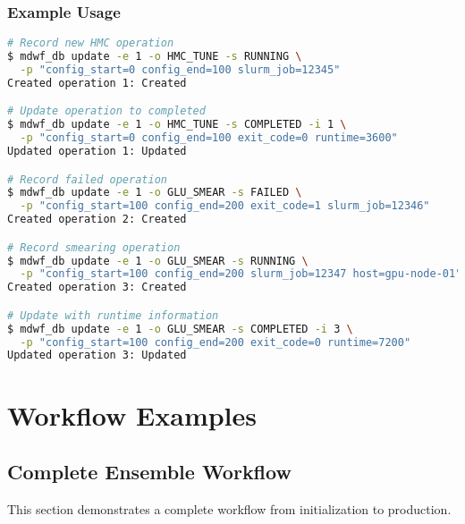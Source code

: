\documentclass{article}
\begin{document}
\subsubsection{Example Usage}

\begin{lstlisting}[language=bash, caption=Update Operation Examples]
# Record new HMC operation
$ mdwf_db update -e 1 -o HMC_TUNE -s RUNNING \
  -p "config_start=0 config_end=100 slurm_job=12345"
Created operation 1: Created

# Update operation to completed
$ mdwf_db update -e 1 -o HMC_TUNE -s COMPLETED -i 1 \
  -p "config_start=0 config_end=100 exit_code=0 runtime=3600"
Updated operation 1: Updated

# Record failed operation
$ mdwf_db update -e 1 -o GLU_SMEAR -s FAILED \
  -p "config_start=100 config_end=200 exit_code=1 slurm_job=12346"
Created operation 2: Created

# Record smearing operation
$ mdwf_db update -e 1 -o GLU_SMEAR -s RUNNING \
  -p "config_start=100 config_end=200 slurm_job=12347 host=gpu-node-01"
Created operation 3: Created

# Update with runtime information
$ mdwf_db update -e 1 -o GLU_SMEAR -s COMPLETED -i 3 \
  -p "config_start=100 config_end=200 exit_code=0 runtime=7200"
Updated operation 3: Updated
\end{lstlisting}

\section{Workflow Examples}

\subsection{Complete Ensemble Workflow}

This section demonstrates a complete workflow from initialization to production.
\end{document}

